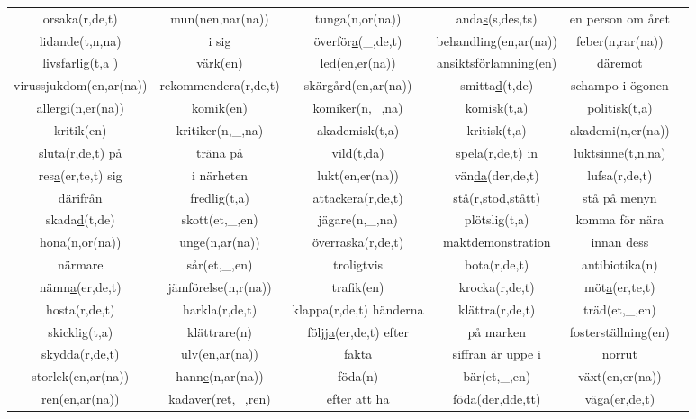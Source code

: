 \begin{center}
\begin{adjustwidth}{-2.7cm}{}
\begin{tabular}{|c c c c c c|}
            orsaka(r,de,t) & mun(nen,nar(na)) & tunga(n,or(na)) & anda\underline{s}(s,des,ts) & en person om året &  \\
            lidande(t,n,na) & i sig & överför\underline{a}(\_,de,t) & behandling(en,ar(na)) & feber(n,rar(na)) &  \\
            livsfarlig(t,a ) & värk(en) & led(en,er(na)) & ansiktsförlamning(en) & däremot &  \\
            virussjukdom(en,ar(na)) & rekommendera(r,de,t) & skärgård(en,ar(na)) & smitta\underline{d}(t,de) & schampo i ögonen &  \\
            allergi(n,er(na)) & komik(en) & komiker(n,\_,na) & komisk(t,a) & politisk(t,a) &  \\
            kritik(en) & kritiker(n,\_,na) & akademisk(t,a) & kritisk(t,a) & akademi(n,er(na)) &  \\
            sluta(r,de,t) på & träna på & vil\underline{d}(t,da) & spela(r,de,t) in & luktsinne(t,n,na) &  \\
            res\underline{a}(er,te,t) sig & i närheten & lukt(en,er(na)) & vän\underline{da}(der,de,t) & lufsa(r,de,t) &  \\
            därifrån & fredlig(t,a) & attackera(r,de,t) & stå(r,stod,stått) & stå på menyn &  \\
            skada\underline{d}(t,de) & skott(et,\_,en) & jägare(n,\_,na) & plötslig(t,a) & komma för nära &  \\
            hona(n,or(na)) & unge(n,ar(na)) & överraska(r,de,t) & maktdemonstration & innan dess &  \\
            närmare & sår(et,\_,en) & troligtvis & bota(r,de,t) & antibiotika(n) &  \\
            nämn\underline{a}(er,de,t) & jämförelse(n,r(na)) & trafik(en) & krocka(r,de,t) & möt\underline{a}(er,te,t) &  \\
            hosta(r,de,t) & harkla(r,de,t) & klappa(r,de,t) händerna & klättra(r,de,t) & träd(et,\_,en) &  \\
            skicklig(t,a) & klättrare(n) & följ\underline{ja}(er,de,t) efter & på marken & fosterställning(en) &  \\
            skydda(r,de,t) & ulv(en,ar(na)) & fakta & siffran är uppe i & norrut &  \\
            storlek(en,ar(na)) & hann\underline{e}(n,ar(na)) & föda(n) & bär(et,\_,en) & växt(en,er(na)) &  \\
            ren(en,ar(na)) & kadav\underline{er}(ret,\_,ren) & efter att ha & fö\underline{da}(der,dde,tt) & väg\underline{a}(er,de,t) &  \\

\end{tabular}
\end{adjustwidth}
\end{center}
